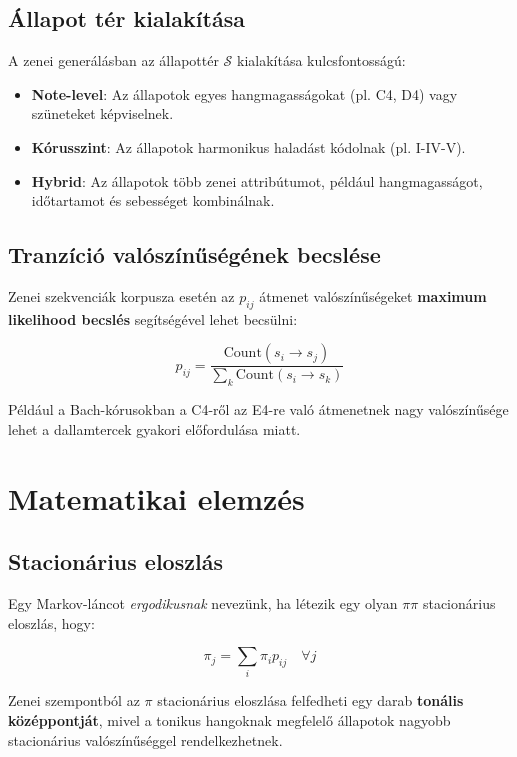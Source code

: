 \subsection{Állapot tér kialakítása}

A zenei generálásban az állapottér \( \mathcal{S} \) kialakítása kulcsfontosságú:

\begin{itemize}
    \item \textbf{Note-level}: Az állapotok egyes hangmagasságokat (pl. C4, D4) vagy szüneteket képviselnek.
    \item \textbf{Kórusszint}: Az állapotok harmonikus haladást kódolnak (pl. I-IV-V).
    \item \textbf{Hybrid}: Az állapotok több zenei attribútumot, például hangmagasságot, időtartamot és sebességet kombinálnak.
\end{itemize}

\subsection{Tranzíció valószínűségének becslése}

Zenei szekvenciák korpusza esetén az \( p_{ij} \) átmenet valószínűségeket \textbf{maximum likelihood becslés} segítségével lehet becsülni:

\[
p_{ij} = \frac{\text{Count}(s_i \rightarrow s_j)}{\sum_{k} \text{Count}(s_i \rightarrow s_k)}
\]

Például a Bach-kórusokban a C4-ről az E4-re való átmenetnek nagy valószínűsége lehet a dallamtercek gyakori előfordulása miatt.

\section{Matematikai elemzés}

\subsection{Stacionárius eloszlás}

Egy Markov-láncot \textit{ergodikusnak} nevezünk, ha létezik egy olyan \( \pi \pi \) stacionárius eloszlás, hogy:

\[
\pi_j = \sum_{i} \pi_i p_{ij} \quad \forall j
\]

Zenei szempontból az \( \pi \) stacionárius eloszlása felfedheti egy darab \textbf{tonális középpontját}, mivel a tonikus hangoknak megfelelő állapotok nagyobb stacionárius valószínűséggel rendelkezhetnek.

